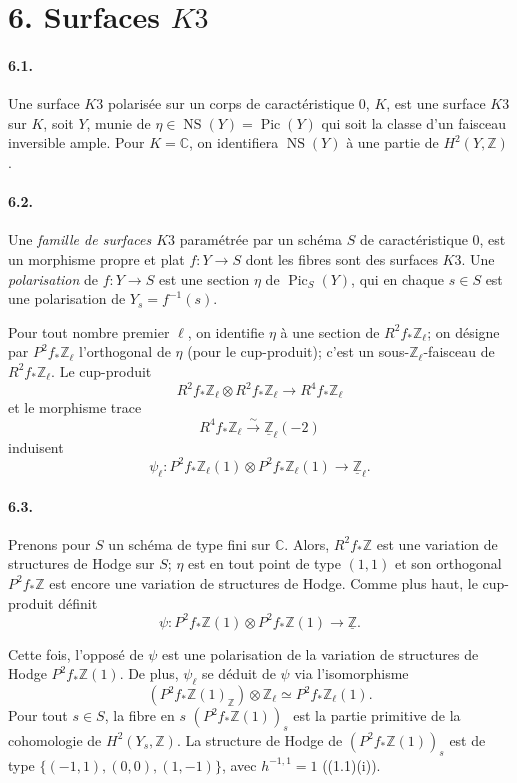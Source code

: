 \documentclass[10pt,leqno]{article}
\newcommand{\C}{\mathbb{C}}
\newcommand{\Z}{\mathbb{Z}}
\newcommand{\Pic}{\operatorname{Pic}}
\providecommand{\NS}{\operatorname{NS}}
\begin{document}
\section*{6. Surfaces $K3$}

\paragraph{6.1.} Une surface $K3$ polarisée sur un corps de caractéristique $0$, $K$, est une surface $K3$ sur $K$, soit $Y$, munie de $\eta\in\NS(Y)=\Pic(Y)$ qui soit la classe d'un faisceau inversible ample. Pour $K=\C$, on identifiera $\NS(Y)$ à une partie de $H^2(Y,\Z)$.

\paragraph{6.2.} Une \emph{famille de surfaces $K3$} paramétrée par un schéma $S$ de caractéristique $0$, est un morphisme propre et plat $f:Y\to S$ dont les fibres sont des surfaces $K3$. Une \emph{polarisation} de $f:Y\to S$ est une section $\eta$ de $\Pic_S(Y)$, qui en chaque $s\in S$ est une polarisation de $Y_s=f^{-1}(s)$.

Pour tout nombre premier $\ell$, on identifie $\eta$ à une section de $R^2f_*\Z_\ell$; on désigne par $P^2f_*\Z_\ell$ l'orthogonal de $\eta$ (pour le cup-produit); c'est un sous-$\Z_\ell$-faisceau de $R^2f_*\Z_\ell$. Le cup-produit
\[
R^2f_*\Z_\ell\otimes R^2f_*\Z_\ell\longrightarrow R^4f_*\Z_\ell
\]
et le morphisme trace
\[
R^4f_*\Z_\ell\xrightarrow{\sim}\underline{\Z}_\ell(-2)
\]
induisent
\[
\tag{6.2.1}
\psi_\ell:P^2f_*\Z_\ell(1)\otimes P^2f_*\Z_\ell(1)\longrightarrow\underline{\Z}_\ell.
\]

\paragraph{6.3.} Prenons pour $S$ un schéma de type fini sur $\C$. Alors, $R^2f_*\Z$ est une variation de structures de Hodge sur $S$; $\eta$ est en tout point de type $(1,1)$ et son orthogonal $P^2f_*\Z$ est encore une variation de structures de Hodge. Comme plus haut, le cup-produit définit
\[
\tag{6.3.1}
\psi:P^2f_*\Z(1)\otimes P^2f_*\Z(1)\longrightarrow\underline{\Z}.
\]

\clearpage

Cette fois, l'opposé de $\psi$ est une polarisation de la variation de structures de Hodge $P^2f_*\Z(1)$. De plus, $\psi_\ell$ se déduit de $\psi$ via l'isomorphisme
\[
(P^2f_*\Z(1)_\Z)\otimes\Z_\ell\simeq P^2f_*\Z_\ell(1).
\]
Pour tout $s\in S$, la fibre en $s$ $(P^2f_*\Z(1))_s$ est la partie primitive de la cohomologie de $H^2(Y_s,\Z)$. La structure de Hodge de $(P^2f_*\Z(1))_s$ est de type $\{(-1,1),(0,0),(1,-1)\}$, avec $h^{-1,1}=1$ ((1.1)(i)).
\end{document}
